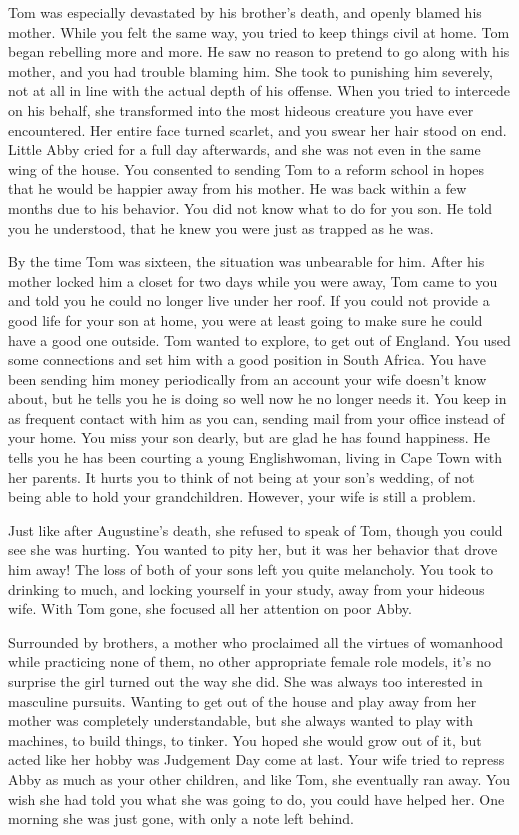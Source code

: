 \documentclass[char]{airship}
\begin{document}
Tom was especially devastated by his brother's death, and openly
blamed his mother. While you felt the same way, you tried to keep
things civil at home. Tom began rebelling more and more. He saw no
reason to pretend to go along with his mother, and you had trouble
blaming him. She took to punishing him severely, not at all in line
with the actual depth of his offense. When you tried to intercede on
his behalf, she transformed into the most hideous creature you have
ever encountered. Her entire face turned scarlet, and you swear her
hair stood on end. Little Abby cried for a full day afterwards, and
she was not even in the same wing of the house. You consented to
sending Tom to a reform school in hopes that he would be happier away
from his mother. He was back within a few months due to his
behavior. You did not know what to do for you son. He told you he
understood, that he knew you were just as trapped as he was. 

By the time Tom was sixteen, the situation was unbearable for
him. After his mother locked him a closet for two days while you were
away, Tom came to you and told you he could no longer live under her
roof. If you could not provide a good life for your son at home, you
were at least going to make sure he could have a good one outside. Tom
wanted to explore, to get out of England. You used some connections
and set him with a good position in South Africa. You have been
sending him money periodically from an account your wife doesn't know
about, but he tells you he is doing so well now he no longer needs
it. You keep in as frequent contact with him as you can, sending mail
from your office instead of your home. You miss your son dearly, but
are glad he has found happiness. He tells you he has been courting a
young Englishwoman, living in Cape Town with her parents. It hurts you
to think of not being at your son's wedding, of not being able to hold
your grandchildren. However, your wife is still a problem.

Just like after Augustine's death, she refused to speak of Tom, though
you could see she was hurting. You wanted to pity her, but it was her
behavior that drove him away! The loss of both of your sons left you
quite melancholy. You took to drinking to much, and locking yourself
in your study, away from your hideous wife.  With Tom gone, she
focused all her attention on poor Abby.

Surrounded by brothers, a mother who proclaimed all the virtues of
womanhood while practicing none of them, no other appropriate female
role models, it's no surprise the girl turned out the way she did. She
was always too interested in masculine pursuits. Wanting to get out of
the house and play away from her mother was completely understandable,
but she always wanted to play with machines, to build things, to
tinker. You hoped she would grow out of it, but \cJack{} acted like
her hobby was Judgement Day come at last. Your wife tried to repress
Abby as much as your other children, and like Tom, she eventually ran
away. You wish she had told you what she was going to do, you could
have helped her. One morning she was just gone, with only a note left behind.
\end{document}
